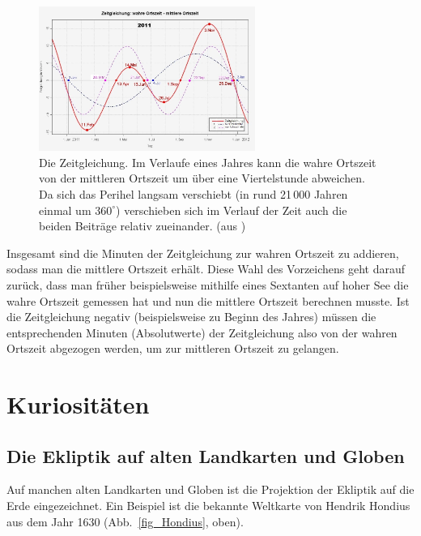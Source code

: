 \begin{figure}
\includegraphics[width=0.63\textwidth]{./Bilder/Zeitgleichung.jpg}
\caption{\label{fig_Zeitgleichung}%
Die Zeitgleichung. Im Verlaufe eines Jahres kann die wahre Ortszeit von der mittleren Ortszeit
um \"uber eine Viertelstunde abweichen. Da sich das Perihel langsam verschiebt (in rund 21\,000 Jahren
einmal um $360^\circ$) verschieben sich im Verlauf der Zeit auch die beiden Beitr\"age relativ zueinander.
(aus \cite{Wikipedia_Zeitgleichung})} 
\end{figure}

Insgesamt sind die Minuten der Zeitgleichung zur wahren Ortszeit zu addieren, sodass man die
mittlere Ortszeit erh\"alt. Diese Wahl des Vorzeichens geht darauf zur\"uck, dass man fr\"uher
beispielsweise mithilfe eines Sextanten auf hoher See die wahre Ortszeit gemessen hat
und nun die mittlere Ortszeit berechnen musste. 
Ist die Zeitgleichung negativ (beispielsweise zu Beginn des Jahres) m\"ussen die 
entsprechenden Minuten (Absolutwerte) der Zeitgleichung also von der wahren Ortszeit 
abgezogen werden, um zur mittleren Ortszeit zu gelangen. 

\section{Kuriosit\"aten}
\subsection{Die Ekliptik auf alten Landkarten und Globen}

Auf manchen alten Landkarten und Globen ist die Projektion der Ekliptik auf die
Erde eingezeichnet. Ein Beispiel ist die bekannte Weltkarte von 
Hendrik Hondius aus dem
Jahr 1630 (Abb.\ \ref{fig_Hondius}, oben).

